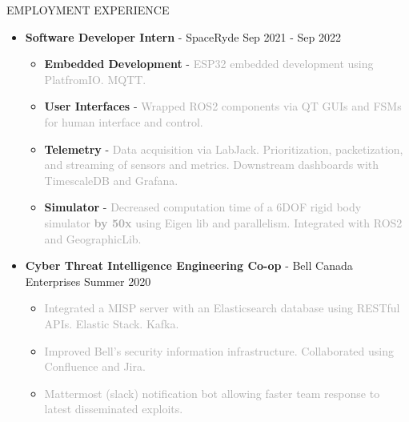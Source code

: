 \documentclass{resume} %
\begin{document}
\begin{rSection}{EMPLOYMENT EXPERIENCE}
    \begin{itemize}
        \item {\bf Software Developer Intern} - SpaceRyde \hfill {Sep 2021 - Sep 2022}
        \begin{itemize}[topsep=-10pt]
            \setlength\itemsep{-0.5em}
            \item[\textbullet] {\bf Embedded Development} - \textcolor{darkgray}{ESP32 embedded development using PlatfromIO. MQTT.}
            \item[\textbullet] {\bf User Interfaces} - \textcolor{darkgray}{Wrapped ROS2 components via QT GUIs and FSMs for human interface and control.}
            \item[\textbullet] {\bf Telemetry} - \textcolor{darkgray}{Data acquisition via LabJack. Prioritization, packetization, and streaming of sensors and metrics. Downstream dashboards with TimescaleDB and Grafana.}
            \item[\textbullet] {\bf Simulator} - \textcolor{darkgray}{Decreased computation time of a 6DOF rigid body simulator \textbf{by 50x} using Eigen lib and parallelism.
            Integrated with ROS2 and GeographicLib.}
        \end{itemize}
        \item {\bf Cyber Threat Intelligence Engineering Co-op} - Bell Canada Enterprises \hfill {Summer 2020}
        \begin{itemize}[topsep=-10pt]
            \setlength\itemsep{-0.5em}
            \item[\textbullet] \textcolor{darkgray}{Integrated a MISP server with an Elasticsearch database using RESTful APIs. Elastic Stack. Kafka.}
            \item[\textbullet] \textcolor{darkgray}{Improved Bell's security information infrastructure. Collaborated using Confluence and Jira.}
            \item[\textbullet] \textcolor{darkgray}{Mattermost (slack) notification bot allowing faster team response to latest disseminated exploits.}
        \end{itemize}
    \end{itemize}
\end{rSection}
\end{document}
